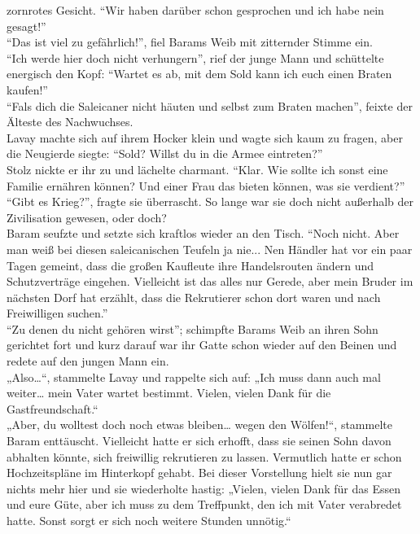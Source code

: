 zornrotes Gesicht. ``Wir haben darüber schon gesprochen und ich habe nein gesagt!''\\
``Das ist viel zu gefährlich!'', fiel Barams Weib mit zitternder Stimme ein.\\
``Ich werde hier doch nicht verhungern'', rief der junge Mann und schüttelte energisch den Kopf: 
``Wartet es ab, mit dem Sold kann ich euch einen Braten kaufen!''\\
``Fals dich die Saleicaner nicht häuten und selbst zum Braten machen'', feixte der Älteste des 
Nachwuchses.\\
Lavay machte sich auf ihrem Hocker klein und wagte sich kaum zu fragen, aber die Neugierde siegte: 
``Sold? Willst du in die Armee eintreten?''\\
Stolz nickte er ihr zu und lächelte charmant. ``Klar. Wie sollte ich sonst eine Familie ernähren 
können? Und einer Frau das bieten können, was sie verdient?''\\
``Gibt es Krieg?'', fragte sie überrascht. So lange war sie doch nicht außerhalb der Zivilisation 
gewesen, oder doch?\\
Baram seufzte und setzte sich kraftlos wieder an den Tisch. ``Noch nicht. Aber man weiß bei diesen 
saleicanischen Teufeln ja nie... Nen Händler hat vor ein paar Tagen gemeint, dass die großen 
Kaufleute ihre Handelsrouten ändern und Schutzverträge eingehen. Vielleicht ist das alles nur 
Gerede, aber mein Bruder im nächsten Dorf hat erzählt, dass die Rekrutierer schon dort waren und 
nach Freiwilligen suchen.''\\
``Zu denen du nicht gehören wirst''; schimpfte Barams Weib an ihren Sohn gerichtet fort und kurz 
darauf war ihr Gatte schon wieder auf den Beinen und redete auf den jungen Mann ein.\\
„Also…“, stammelte Lavay und rappelte sich auf: „Ich muss dann auch mal weiter… mein Vater wartet 
bestimmt. Vielen, vielen Dank für die Gastfreundschaft.“\\
„Aber, du wolltest doch noch etwas bleiben… wegen den Wölfen!“, stammelte Baram enttäuscht. 
Vielleicht hatte er sich erhofft, dass sie seinen Sohn davon abhalten könnte, sich freiwillig 
rekrutieren zu lassen. Vermutlich hatte er schon Hochzeitspläne im Hinterkopf gehabt. Bei dieser 
Vorstellung hielt sie nun gar nichts mehr hier und sie wiederholte hastig: „Vielen, vielen Dank für 
das Essen und eure Güte, aber ich muss zu dem Treffpunkt, den ich mit Vater verabredet hatte. Sonst 
sorgt er sich noch weitere Stunden unnötig.“\\
